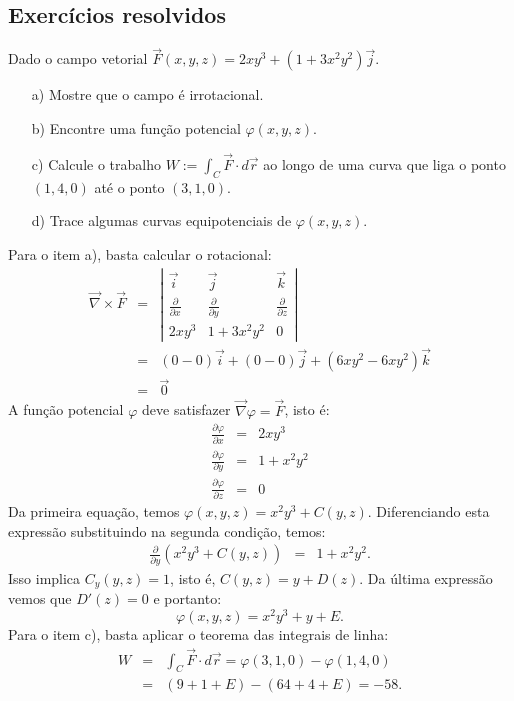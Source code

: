 \subsection*{Exercícios resolvidos}
\begin{exeresol}
  Dado o campo vetorial $\vec{F}(x,y,z) = 2xy^3+(1+3x^2y^2)\vec{j}$.
  \begin{itemize}
  \item[a)] Mostre que o campo é irrotacional.
  \item[b)] Encontre uma função potencial $\varphi(x,y,z)$.
  \item[c)] Calcule o trabalho $W:=\int_C \vec{F}\cdot d\vec{r}$ ao longo de uma curva que liga o ponto $(1,4,0)$ até o ponto $(3,1,0)$.
  \item[d)] Trace algumas curvas equipotenciais de $\varphi(x,y,z)$.
  \end{itemize}
\end{exeresol}
\begin{resol}
  Para o item a), basta calcular o rotacional:
  \begin{eqnarray*}
  \vec{\nabla}\times \vec{F} &=& \left|
  \begin{array}{ccc}
  \vec{i} & \vec{j} & \vec{k} \\
  \frac{\partial}{\partial x} & \frac{\partial}{\partial y} & \frac{\partial}{\partial z}\\
  2xy^3 & 1+3x^2y^2 & 0
  \end{array}
  \right| \\
  &=& \left(0-0\right)\vec{i} + \left(0-0\right)\vec{j} + \left(6xy^2-6xy^2\right)\vec{k}\\
  &=& \vec{0}
  \end{eqnarray*}
A função potencial $\varphi$ deve satisfazer $\vec{\nabla}\varphi=\vec{F}$, isto é:
\begin{eqnarray*}
\frac{\partial \varphi}{\partial x} &=& 2xy^3 \\
\frac{\partial \varphi}{\partial y} &=& 1+x^2y^2 \\
\frac{\partial \varphi}{\partial z} &=& 0
\end{eqnarray*}
Da primeira equação, temos $\varphi(x,y,z)= x^2y^3+C(y,z)$. Diferenciando esta expressão substituindo na segunda condição, temos:
\begin{eqnarray*}
\frac{\partial }{\partial y}(x^2y^3+C(y,z)) &=& 1+x^2y^2.
\end{eqnarray*}
Isso implica $C_y(y,z)=1$, isto é, $C(y,z) = y+D(z)$. Da última expressão vemos que $D'(z)=0$ e portanto:
$$\varphi(x,y,z)=x^2y^3+y+E.$$
Para o item c), basta aplicar o teorema das integrais de linha:
\begin{eqnarray*}
W &=& \int_C \vec{F}\cdot d\vec{r} = \varphi(3,1,0)- \varphi(1,4,0)\\
  &=& (9+1+E) - (64+4+E) = -58.
\end{eqnarray*}
\end{resol}

